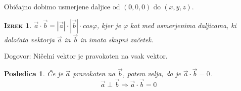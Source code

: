 \documentclass[a4paper,12pt]{article}
\newtheorem*{izrek}{\textsc{Izrek}}
\newtheorem*{posl}{Posledica}
\begin{document}
Običajno dobimo usmerjene daljice od $(0,0,0)$ do $(x,y,z)$.\\

\begin{izrek}
$\vec{a} \cdot \vec{b} = |\vec{a}| \cdot |\vec{b}| \cdot cos\varphi$, kjer je $\varphi$ kot med usmerjenima daljicama, ki določata vektorja $\vec{a}$ in $\vec{b}$ in imata skupni začetek.\\
\end{izrek}

Dogovor: Ničelni vektor je pravokoten na vsak vektor. \\

\begin{posl}
Če je $\vec{a}$ pravokoten na $\vec{b}$, potem velja, da je $\vec{a} \cdot \vec{b} = 0$. $$ \vec{a} \perp \vec{b} \Rightarrow \vec{a} \cdot \vec{b} = 0$$
\end{posl}
\end{document}
